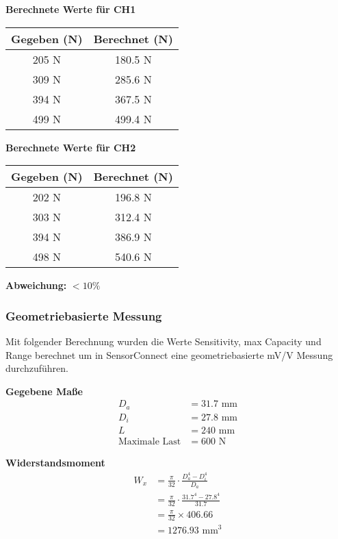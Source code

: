 \textbf{Berechnete Werte für CH1}
\begin{center}
\begin{tabular}{|c|c|}
\hline
\textbf{Gegeben (N)} & \textbf{Berechnet (N)} \\
\hline
205 N & 180.5 N \\
309 N & 285.6 N \\
394 N & 367.5 N \\
499 N & 499.4 N \\
\hline
\end{tabular}
\end{center}

\textbf{Berechnete Werte für CH2}
\begin{center}
\begin{tabular}{|c|c|}
\hline
\textbf{Gegeben (N)} & \textbf{Berechnet (N)} \\
\hline
202 N & 196.8 N \\
303 N & 312.4 N \\
394 N & 386.9 N \\
498 N & 540.6 N \\
\hline
\end{tabular}
\end{center}

\textbf{Abweichung:} $<10\%$

\subsubsection{Geometriebasierte Messung}
\label{sec:lenkerberechnung}
Mit folgender Berechnung wurden die Werte Sensitivity, max Capacity und Range berechnet um in SensorConnect eine geometriebasierte mV/V Messung durchzuführen.

\textbf{Gegebene Maße}
\begin{align*}
D_a &= 31.7 \text{ mm}  \\
D_i &= 27.8 \text{ mm}  \\
L &= 240 \text{ mm}  \\
\text{Maximale Last} &= 600 \text{ N}
\end{align*}

\textbf{Widerstandsmoment}
\begin{align*}
W_x &= \frac{\pi}{32} \cdot \frac{D_a^4 - D_i^4}{D_a} \\
    &= \frac{\pi}{32} \cdot \frac{31.7^4 - 27.8^4}{31.7} \\
    &= \frac{\pi}{32} \times 406.66 \\
    &= 1276.93 \text{ mm}^3
\end{align*}

